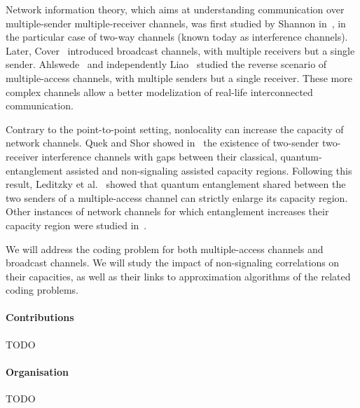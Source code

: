 Network information theory, which aims at understanding communication over multiple-sender multiple-receiver channels, was first studied by Shannon in~\cite{Shannon61}, in the particular case of two-way channels (known today as interference channels). Later, Cover~\cite{Cover72} introduced broadcast channels, with multiple receivers but a single sender. Ahlswede~\cite{Ahlswede73} and independently Liao~\cite{Liao73} studied the reverse scenario of multiple-access channels, with multiple senders but a single receiver. These more complex channels allow a better modelization of real-life interconnected communication.

Contrary to the point-to-point setting, nonlocality can increase the capacity of network channels. Quek and Shor showed in~\cite{QS17} the existence of two-sender two-receiver interference channels with gaps between their classical, quantum-entanglement assisted and non-signaling assisted capacity regions. Following this result, Leditzky et al.~\cite{LALS20,SLSS22} showed that quantum entanglement shared between the two senders of a multiple-access channel can strictly enlarge its capacity region. Other instances of network channels for which entanglement increases their capacity region were studied in~\cite{Noetzel20,ND20}.

We will address the coding problem for both multiple-access channels and broadcast channels. We will study the impact of non-signaling correlations on their capacities, as well as their links to approximation algorithms of the related coding problems.

\paragraph{Contributions} TODO

\paragraph{Organisation} TODO
